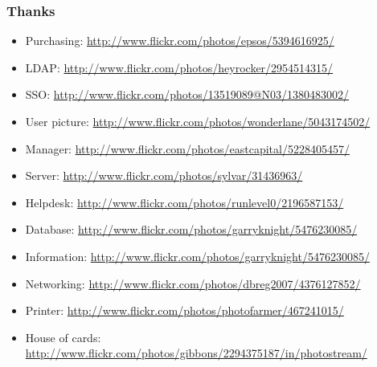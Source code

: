 \documentclass{beamer}
\begin{document}
\begin{frame}
    \frametitle{Thanks}

        \begin{itemize}
                \item Purchasing: \url{http://www.flickr.com/photos/epsos/5394616925/}
                \item LDAP: \url{http://www.flickr.com/photos/heyrocker/2954514315/}
                \item SSO: \url{http://www.flickr.com/photos/13519089@N03/1380483002/}
                \item User picture: \url{http://www.flickr.com/photos/wonderlane/5043174502/}
                \item Manager: \url{http://www.flickr.com/photos/eastcapital/5228405457/}
                \item Server: \url{http://www.flickr.com/photos/sylvar/31436963/}
                \item Helpdesk: \url{http://www.flickr.com/photos/runlevel0/2196587153/}
                \item Database: \url{http://www.flickr.com/photos/garryknight/5476230085/}
                \item Information: \url{http://www.flickr.com/photos/garryknight/5476230085/}
                \item Networking: \url{http://www.flickr.com/photos/dbreg2007/4376127852/}
                \item Printer: \url{http://www.flickr.com/photos/photofarmer/467241015/}
                \item House of cards: \url{http://www.flickr.com/photos/gibbons/2294375187/in/photostream/}
        \end{itemize}

\end{frame}
\end{document}

